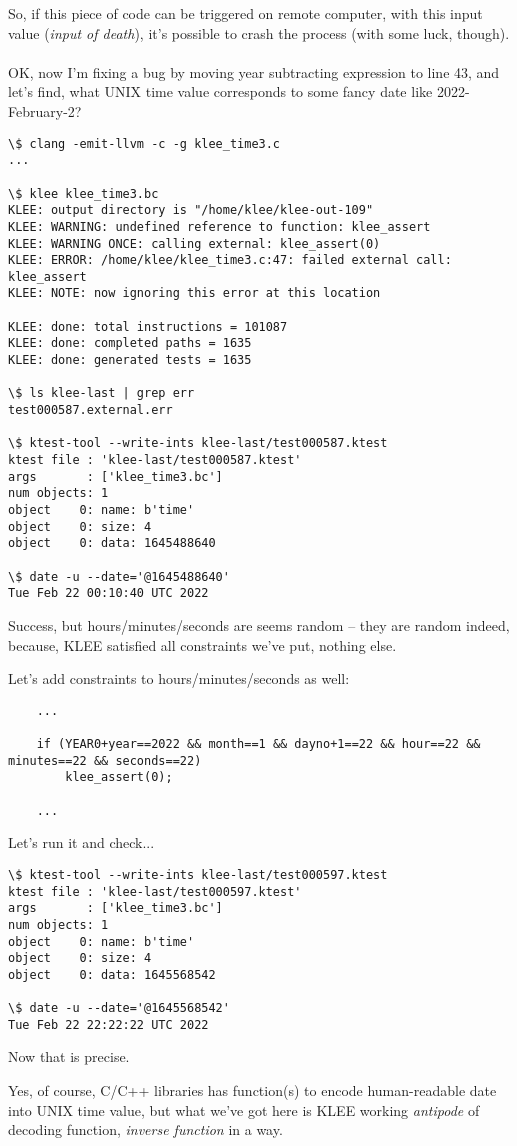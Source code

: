 So, if this piece of code can be triggered on remote computer, with this input value (\textit{input of death}),
it's possible to crash the process (with some luck, though).\\
\\
OK, now I'm fixing a bug by moving year subtracting expression to line 43, and let's find, what UNIX time value corresponds to some fancy date
like 2022-February-2?



\begin{lstlisting}
\$ clang -emit-llvm -c -g klee_time3.c
...

\$ klee klee_time3.bc
KLEE: output directory is "/home/klee/klee-out-109"
KLEE: WARNING: undefined reference to function: klee_assert
KLEE: WARNING ONCE: calling external: klee_assert(0)
KLEE: ERROR: /home/klee/klee_time3.c:47: failed external call: klee_assert
KLEE: NOTE: now ignoring this error at this location

KLEE: done: total instructions = 101087
KLEE: done: completed paths = 1635
KLEE: done: generated tests = 1635

\$ ls klee-last | grep err
test000587.external.err

\$ ktest-tool --write-ints klee-last/test000587.ktest
ktest file : 'klee-last/test000587.ktest'
args       : ['klee_time3.bc']
num objects: 1
object    0: name: b'time'
object    0: size: 4
object    0: data: 1645488640

\$ date -u --date='@1645488640'
Tue Feb 22 00:10:40 UTC 2022
\end{lstlisting}

Success, but hours/minutes/seconds are seems random -- they are random indeed, because, KLEE satisfied all constraints we've put, nothing else.

Let's add constraints to hours/minutes/seconds as well:

\begin{lstlisting}
	...

	if (YEAR0+year==2022 && month==1 && dayno+1==22 && hour==22 && minutes==22 && seconds==22)
		klee_assert(0);
	
	...
\end{lstlisting}

Let's run it and check...

\begin{lstlisting}
\$ ktest-tool --write-ints klee-last/test000597.ktest
ktest file : 'klee-last/test000597.ktest'
args       : ['klee_time3.bc']
num objects: 1
object    0: name: b'time'
object    0: size: 4
object    0: data: 1645568542

\$ date -u --date='@1645568542'
Tue Feb 22 22:22:22 UTC 2022
\end{lstlisting}

Now that is precise.

Yes, of course, C/C++ libraries has function(s) to encode human-readable date into UNIX time value, but what we've got here is KLEE working
\textit{antipode} of decoding function, \textit{inverse function} in a way.

